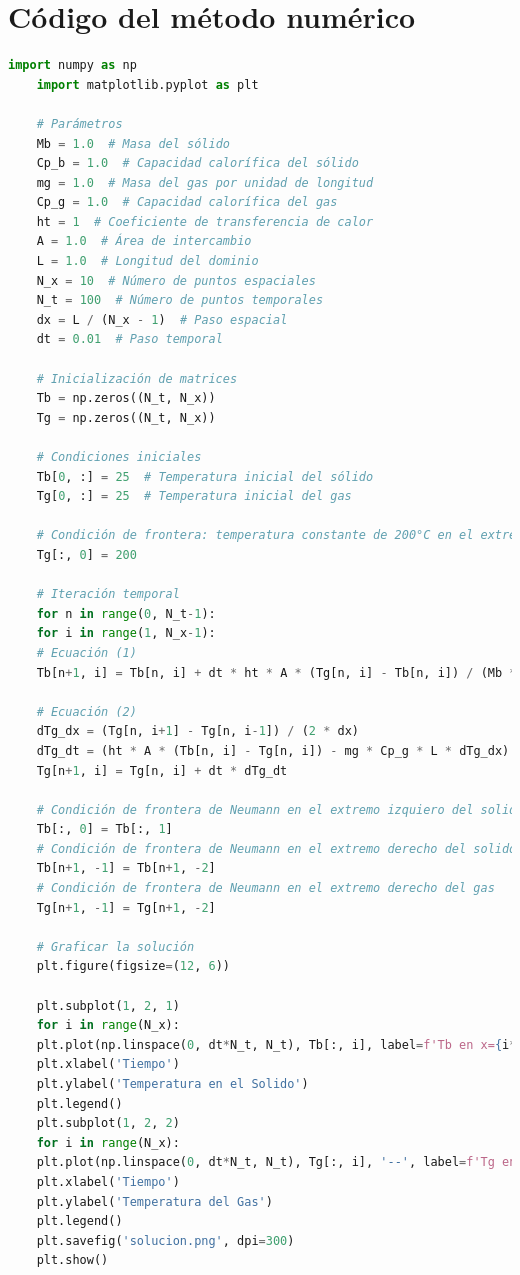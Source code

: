 \documentclass[12pt,letterpaper,final]{article}%
\begin{document}
	\section{Código del método numérico}
	\label{Codigo1}
	\begin{lstlisting}[language=Python]
	import numpy as np
	import matplotlib.pyplot as plt
	
	# Parámetros
	Mb = 1.0  # Masa del sólido
	Cp_b = 1.0  # Capacidad calorífica del sólido
	mg = 1.0  # Masa del gas por unidad de longitud
	Cp_g = 1.0  # Capacidad calorífica del gas
	ht = 1  # Coeficiente de transferencia de calor
	A = 1.0  # Área de intercambio
	L = 1.0  # Longitud del dominio
	N_x = 10  # Número de puntos espaciales
	N_t = 100  # Número de puntos temporales
	dx = L / (N_x - 1)  # Paso espacial
	dt = 0.01  # Paso temporal
	
	# Inicialización de matrices
	Tb = np.zeros((N_t, N_x))
	Tg = np.zeros((N_t, N_x))
	
	# Condiciones iniciales
	Tb[0, :] = 25  # Temperatura inicial del sólido
	Tg[0, :] = 25  # Temperatura inicial del gas
	
	# Condición de frontera: temperatura constante de 200°C en el extremo izquierdo del gas
	Tg[:, 0] = 200
	
	# Iteración temporal
	for n in range(0, N_t-1):
	for i in range(1, N_x-1):
	# Ecuación (1)
	Tb[n+1, i] = Tb[n, i] + dt * ht * A * (Tg[n, i] - Tb[n, i]) / (Mb * Cp_b)
	
	# Ecuación (2)
	dTg_dx = (Tg[n, i+1] - Tg[n, i-1]) / (2 * dx)
	dTg_dt = (ht * A * (Tb[n, i] - Tg[n, i]) - mg * Cp_g * L * dTg_dx) / (Mb * Cp_g)
	Tg[n+1, i] = Tg[n, i] + dt * dTg_dt
	
	# Condición de frontera de Neumann en el extremo izquiero del solido
	Tb[:, 0] = Tb[:, 1]
	# Condición de frontera de Neumann en el extremo derecho del solido
	Tb[n+1, -1] = Tb[n+1, -2]
	# Condición de frontera de Neumann en el extremo derecho del gas
	Tg[n+1, -1] = Tg[n+1, -2]
	
	# Graficar la solución
	plt.figure(figsize=(12, 6))
	
	plt.subplot(1, 2, 1)
	for i in range(N_x):
	plt.plot(np.linspace(0, dt*N_t, N_t), Tb[:, i], label=f'Tb en x={i*dx:.2f}')
	plt.xlabel('Tiempo')
	plt.ylabel('Temperatura en el Solido')
	plt.legend()
	plt.subplot(1, 2, 2)
	for i in range(N_x):
	plt.plot(np.linspace(0, dt*N_t, N_t), Tg[:, i], '--', label=f'Tg en x={i*dx:.2f}')
	plt.xlabel('Tiempo')
	plt.ylabel('Temperatura del Gas')
	plt.legend()
	plt.savefig('solucion.png', dpi=300)
	plt.show()
\end{lstlisting}
\newpage	
\end{document}
